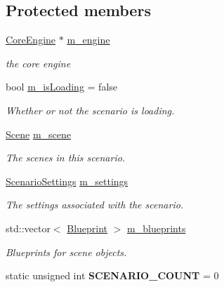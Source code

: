 \subsection*{Protected members}
\begin{DoxyCompactItemize}
\item 
\mbox{\label{classrev_1_1_scenario_a45cf072b5377477a0b9e8a4cec682735}} 
\mbox{\hyperlink{classrev_1_1_core_engine}{Core\+Engine}} $\ast$ \mbox{\hyperlink{classrev_1_1_scenario_a45cf072b5377477a0b9e8a4cec682735}{m\+\_\+engine}}
\begin{DoxyCompactList}\small\item\em the core engine \end{DoxyCompactList}\item 
\mbox{\label{classrev_1_1_scenario_a303ba2c0aaa4d16621a409d16d35d608}} 
bool \mbox{\hyperlink{classrev_1_1_scenario_a303ba2c0aaa4d16621a409d16d35d608}{m\+\_\+is\+Loading}} = false
\begin{DoxyCompactList}\small\item\em Whether or not the scenario is loading. \end{DoxyCompactList}\item 
\mbox{\label{classrev_1_1_scenario_adc863e46a27e257dfdd289331cf2e64f}} 
\mbox{\hyperlink{classrev_1_1_scene}{Scene}} \mbox{\hyperlink{classrev_1_1_scenario_adc863e46a27e257dfdd289331cf2e64f}{m\+\_\+scene}}
\begin{DoxyCompactList}\small\item\em The scenes in this scenario. \end{DoxyCompactList}\item 
\mbox{\label{classrev_1_1_scenario_a322afc25596d8040f0c67da95d1d66f4}} 
\mbox{\hyperlink{classrev_1_1_scenario_settings}{Scenario\+Settings}} \mbox{\hyperlink{classrev_1_1_scenario_a322afc25596d8040f0c67da95d1d66f4}{m\+\_\+settings}}
\begin{DoxyCompactList}\small\item\em The settings associated with the scenario. \end{DoxyCompactList}\item 
\mbox{\label{classrev_1_1_scenario_a0e6d90d8ea1426e062806bc986d107b6}} 
std\+::vector$<$ \mbox{\hyperlink{classrev_1_1_blueprint}{Blueprint}} $>$ \mbox{\hyperlink{classrev_1_1_scenario_a0e6d90d8ea1426e062806bc986d107b6}{m\+\_\+blueprints}}
\begin{DoxyCompactList}\small\item\em Blueprints for scene objects. \end{DoxyCompactList}\item 
\mbox{\label{classrev_1_1_scenario_af795b3a1ab4ba7cd553c3f640c59a8fa}} 
static unsigned int {\bfseries S\+C\+E\+N\+A\+R\+I\+O\+\_\+\+C\+O\+U\+NT} = 0
\end{DoxyCompactItemize}
